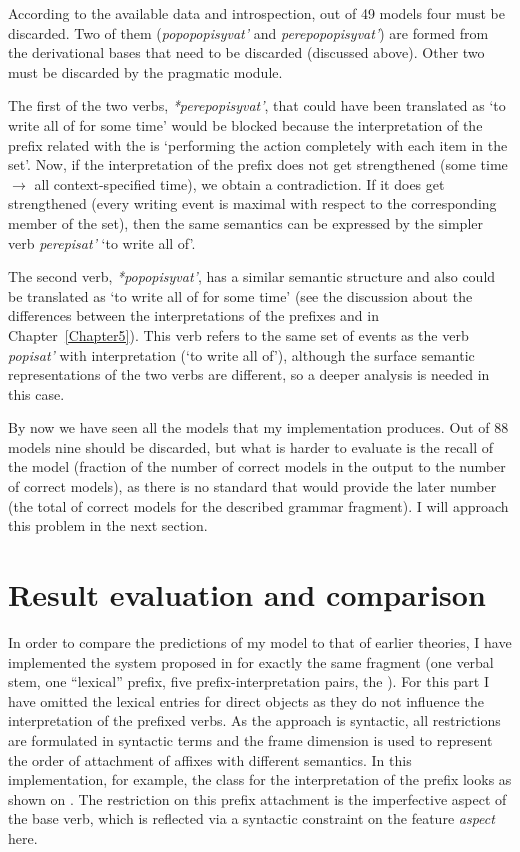 According to the available data and introspection, out of 49 models four must be discarded. Two of them (\textit{popopopisyvat'} and \textit{perepopopisyvat'}) are formed from the derivational bases that need to be discarded (discussed above). Other two must be discarded by the pragmatic module.

The first of the two verbs, \textit{*perepopisyvat'}, that could have been translated as `to write all of for some time' would be blocked because the interpretation of the prefix  related with the  is `performing the action completely with each item in the set'. Now, if the interpretation of the prefix  does not get strengthened (some time $\rightarrow$ all context-specified time), we obtain a contradiction.  If it does get strengthened (every writing event is maximal with respect to the corresponding member of the set), then the same semantics can be expressed by the simpler verb \textit{perepisat'} `to write all of'. 

The second verb, \textit{*popopisyvat'}, has a similar semantic structure and also could be translated as `to write all of for some time' (see the discussion about the differences between the  interpretations of the prefixes  and  in Chapter~\ref{Chapter5}). This verb refers to the same set of events as the verb \textit{popisat'} with  interpretation (`to write all of'), although the surface semantic representations of the two verbs are different, so a deeper analysis is needed in this case.

By now we have seen all the models that my implementation produces. Out of 88 models nine should be discarded, but what is harder to evaluate is the recall of the model (fraction of the number of correct models in the output to the number of correct models), as there is no standard that would provide the later number (the total of correct models for the described grammar fragment). I will approach this problem in the next section.

\section{Result evaluation and comparison}\largerpage
In order to compare the predictions of my model to that of earlier theories, I have implemented the system proposed in \citet{Tatevosov:09} for exactly the same fragment (one verbal stem, one ``lexical'' prefix, five prefix-interpretation pairs, the ). For this part I have omitted the lexical entries for direct objects as they do not influence the interpretation of the prefixed verbs. As the approach is syntactic, all restrictions are formulated in syntactic terms and the frame dimension is used to represent the order of attachment of affixes with different semantics. In this implementation, for example, the class for the  interpretation of the prefix  looks as shown on . The restriction on this prefix attachment is the imperfective aspect of the base verb, which is reflected via a syntactic constraint on the feature \textit{aspect} here.

